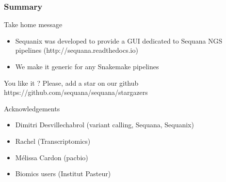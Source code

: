 \documentclass{beamer}
\begin{document}
\begin{frame}
 \frametitle{Summary}

\begin{block}{Take home message}
    \begin{itemize}
        \item Sequanix was developed to provide a GUI dedicated to Sequana NGS pipelines
(http://sequana.readthedocs.io)
        \item We make it generic for any Snakemake pipelines
    \end{itemize}
\end{block}

\begin{block}{You like it ? Please, add a star on our github}
    https://github.com/sequana/sequana/stargazers
    \centering
\end{block}

\begin{block}{Acknowledgements}
 \begin{itemize}
  \item Dimitri Desvillechabrol (variant calling, Sequana, Sequanix)
  \item Rachel (Transcriptomics)
  \item M\'elissa Cardon (pacbio)
  \item Biomics users (Institut Pasteur)
 \end{itemize}
\end{block}

\end{frame}
\end{document}
